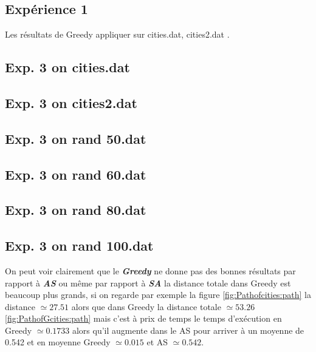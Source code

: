 \flushleft

\subsection{Expérience 1}
Les résultats de Greedy appliquer sur cities.dat, cities2.dat .
\subsection*{ \centering Exp. 3 on cities.dat }



\subsection*{ \centering Exp. 3 on cities2.dat }

\comm{}
\subsection*{ \centering Exp. 3 on rand 50.dat}


\subsection*{ \centering Exp. 3 on rand 60.dat}



\subsection*{ \centering Exp. 3 on rand 80.dat}


\subsection*{ \centering Exp. 3 on rand 100.dat}


\comm{}

On peut voir clairement que le \textit{\textbf{Greedy}} ne donne pas des bonnes résultats par rapport à \textbf{\textit{AS}} ou même par rapport à \textit{\textbf{SA}} la distance totale dans Greedy est beaucoup plus grands, si on regarde par exemple la figure \ref{fig:Pathofcities:path} la distance $ \simeq 27.51$  alors que dans Greedy la distance totale $ \simeq 53.26$ \ref{fig:PathofGcities:path} mais c'est à prix de temps le temps d'exécution en Greedy  $\simeq 0.1733$  alors qu'il augmente dans le AS pour arriver à un moyenne de  0.542 et en moyenne Greedy $ \simeq 0.015 $ et AS $ \simeq 0.542$.